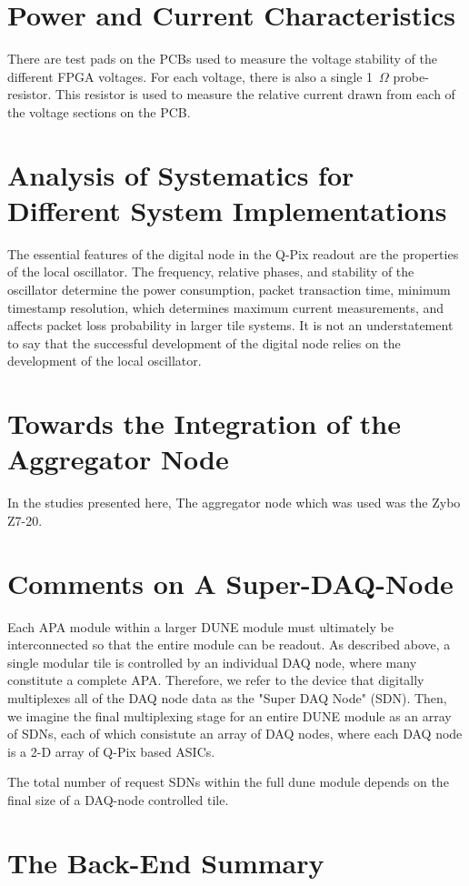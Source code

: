 \section{Power and Current Characteristics}

There are test pads on the PCBs used to measure the voltage stability of the different FPGA voltages.
For each voltage, there is also a single 1~$\unit{\Omega}$ probe-resistor.
This resistor is used to measure the relative current drawn from each of the voltage sections on the PCB.

\section{Analysis of Systematics for Different System Implementations}

The essential features of the digital node in the Q-Pix readout are the properties of the local oscillator.
The frequency, relative phases, and stability of the oscillator determine the power consumption, packet transaction time, minimum timestamp resolution, which determines maximum current measurements, and affects packet loss probability in larger tile systems.
It is not an understatement to say that the successful development of the digital node relies on the development of the local oscillator.

\section{Towards the Integration of the Aggregator Node}

In the studies presented here, The aggregator node which was used was the Zybo Z7-20.


\section{Comments on A Super-DAQ-Node}

Each APA module within a larger DUNE module must ultimately be interconnected so that the entire module can be readout.
As described above, a single modular tile is controlled by an individual DAQ node, where many constitute a complete APA.
Therefore, we refer to the device that digitally multiplexes all of the DAQ node data as the "Super DAQ Node" (SDN).
Then, we imagine the final multiplexing stage for an entire DUNE module as an array of SDNs, each of which consistute an array of DAQ nodes, where each DAQ node is a 2-D array of Q-Pix based ASICs.

The total number of request SDNs within the full dune module depends on the final size of a DAQ-node controlled tile.


\section{The Back-End Summary}
